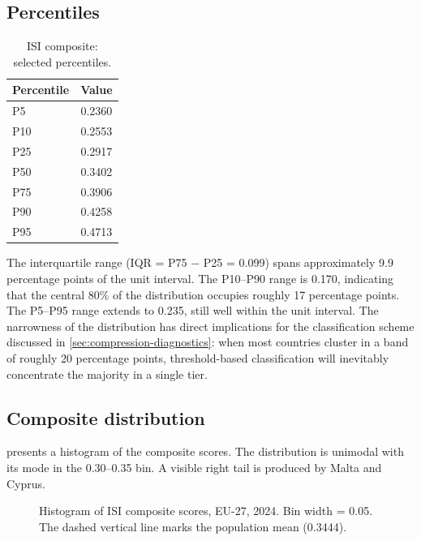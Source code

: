 \subsection{Percentiles}

\begin{table}[htbp]
\centering
\caption{ISI composite: selected percentiles.}
\label{tab:percentiles}
\begin{tabular}{@{}lS[table-format=1.4]@{}}
\toprule
\textbf{Percentile} & {\textbf{Value}} \\
\midrule
P5   & 0.2360 \\
P10  & 0.2553 \\
P25  & 0.2917 \\
P50  & 0.3402 \\
P75  & 0.3906 \\
P90  & 0.4258 \\
P95  & 0.4713 \\
\bottomrule
\end{tabular}
\end{table}

The interquartile range (IQR = P75 $-$ P25 = 0.099)
spans approximately 9.9 percentage points of the unit interval.
The P10--P90 range is 0.170, indicating that the central
80\% of the distribution occupies roughly 17 percentage points.
The P5--P95 range extends to 0.235, still well within the
unit interval.  The narrowness of the distribution has direct
implications for the classification scheme discussed in
\cref{sec:compression-diagnostics}: when most countries cluster in
a band of roughly 20 percentage points, threshold-based classification
will inevitably concentrate the majority in a single tier.

\subsection{Composite distribution}\label{sec:composite-distribution}

 presents a histogram of the composite scores.
The distribution is unimodal with its mode in the 0.30--0.35 bin.
A visible right tail is produced by Malta and Cyprus.

\begin{figure}[htbp]
\centering

\caption{Histogram of ISI composite scores, EU-27, 2024.  Bin width
  = 0.05.  The dashed vertical line marks the population mean
  (\num{0.3444}).}
\label{fig:histogram}
\end{figure}

